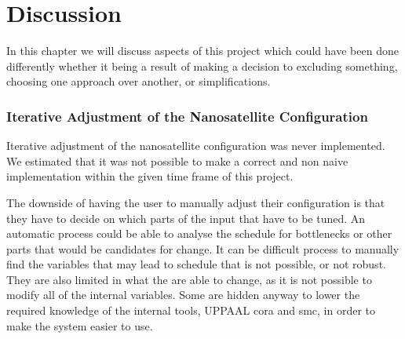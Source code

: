 \chapter{Discussion} \label{sec:discussion}
In this chapter we will discuss aspects of this project which could have been done differently whether it being a result of making a decision to excluding something, choosing one approach over another, or simplifications.

\subsection*{Iterative Adjustment of the Nanosatellite Configuration} \label{subsec:disc_itt}
Iterative adjustment of the nanosatellite configuration was never implemented. We estimated that it was not possible to make a correct and non naive implementation within the given time frame of this project.

The downside of having the user to manually adjust their configuration is that they have to decide on which parts of the input that have to be tuned. An automatic process could be able to analyse the schedule for bottlenecks or other parts that would be candidates for change. It can be difficult process to manually find the variables that may lead to schedule that is not possible, or not robust. They are also limited in what the are able to change, as it is not possible to modify all of the internal variables. Some are hidden anyway to lower the required knowledge of the internal tools, UPPAAL \gls{cora} and \gls{smc}, in order to make the system easier to use. 

